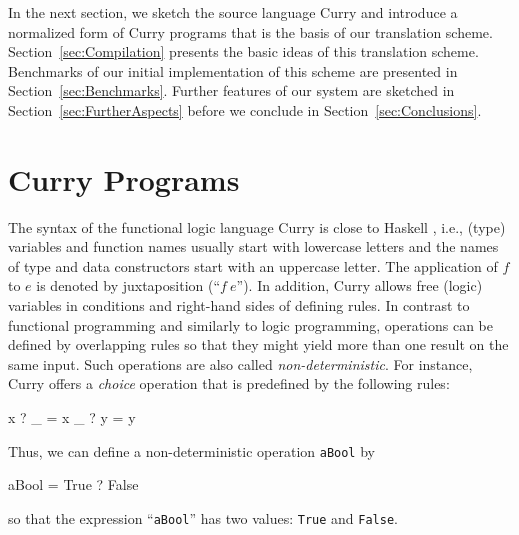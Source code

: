 \documentclass{llncs}
\newcommand{\code}[1]{\mbox{\small\texttt{#1}}}
\newcommand{\ccode}[1]{``\code{#1}''}
\begin{document}
In the next section, we sketch the source language Curry
and introduce a normalized form of Curry programs that is the
basis of our translation scheme.
Section~\ref{sec:Compilation} presents the basic ideas
of this translation scheme.
Benchmarks of our initial implementation of this scheme
are presented in Section~\ref{sec:Benchmarks}.
Further features of our system are sketched in
Section~\ref{sec:FurtherAspects}
before we conclude in Section~\ref{sec:Conclusions}.



\section{Curry Programs}
\label{sec:Curry}

The syntax of the functional logic language Curry \cite{Hanus06Curry}
is close to Haskell \cite{PeytonJones03Haskell}, i.e.,
(type) variables and function names usually
start with lowercase letters and the names of type and data constructors
start with an uppercase letter. The application of $f$
to $e$ is denoted by juxtaposition (``$f~e$'').
In addition, Curry allows free (logic)
variables in conditions and right-hand sides of defining rules.
In contrast to functional programming and similarly to logic programming,
operations can be defined by overlapping rules so that
they might yield more than one result on the same input.
Such operations are also called \emph{non-deterministic}.
For instance, Curry offers a \emph{choice} operation that is predefined by
the following rules:
%
\begin{curry}
  x ? _ = x
  _ ? y = y
\end{curry}
%
Thus, we can define a non-deterministic operation \code{aBool} by
\label{ex:aBool}
%
\begin{curry}
  aBool = True ? False
\end{curry}
%
so that the expression \ccode{aBool} has two values:
\code{True} and \code{False}.
\end{document}

